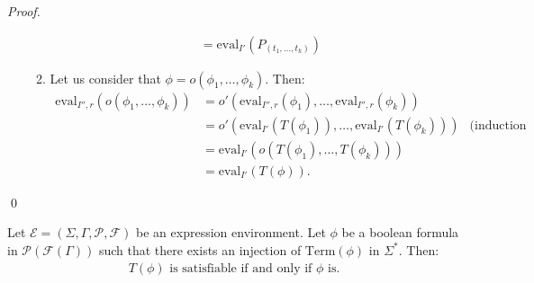 \documentclass[a4paper]{llncs}
\begin{document}
\begin{proof}
\begin{enumerate}
\begin{enumerate}
\begin{align*}
        &=\mathrm{eval}_{I'}(P_{(t_1,\ldots,t_k)})
      \end{align*}
      \item Let us consider that $\phi=o(\phi_1,\ldots,\phi_k)$. Then:
        \begin{align*}
          \mathrm{eval}_{I'',r}(o(\phi_1,\ldots,\phi_k))& =o'(\mathrm{eval}_{I'',r}(\phi_1),\ldots,\mathrm{eval}_{I'',r}(\phi_k))\\
          & =o'(\mathrm{eval}_{I'}(T(\phi_1)),\ldots,\mathrm{eval}_{I'}(T(\phi_k))) & \text{(induction hypothesis)}\\
          & =\mathrm{eval}_{I'}(o(T(\phi_1),\ldots,T(\phi_k)))\\
          & =\mathrm{eval}_{I'}(T(\phi)).
        \end{align*}
    \end{enumerate} 
    \end{enumerate}
    \qed
  \end{proof}
  
  \begin{corollary}\label{cor tphi sat phi aussi}
    Let $\mathcal{E}=(\Sigma,\Gamma,\mathcal{P},\mathcal{F})$ be an expression environment. Let $\phi$ be a boolean formula in $\mathcal{P}(\mathcal{F}(\Gamma))$ such that there exists an injection of $\mathrm{Term}(\phi)$ in $\Sigma^*$. Then:
        \begin{align*}
      \text{$T(\phi)$ is satisfiable if and only if $\phi$ is.}
        \end{align*}
  \end{corollary}
  
\end{document}
